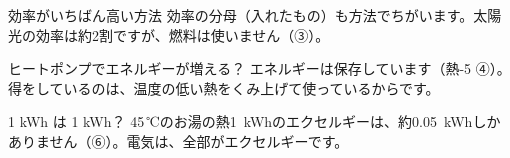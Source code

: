 \begin{tsumazuki}{効率がいちばん高い方法}
効率の分母（入れたもの）も方法でちがいます。太陽光の効率は約2割ですが、燃料は使いません（③）。
\end{tsumazuki}
\begin{tsumazuki}{ヒートポンプでエネルギーが増える？}
エネルギーは保存しています（熱-5 ④）。得をしているのは、温度の低い熱をくみ上げて使っているからです。
\end{tsumazuki}
\begin{tsumazuki}{1 kWh は 1 kWh？}
45\,℃のお湯の熱\qty{1}{kWh}のエクセルギーは、約\qty{0.05}{kWh}しかありません（⑥）。電気は、全部がエクセルギーです。
\end{tsumazuki}


